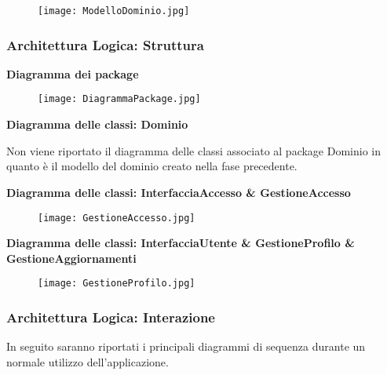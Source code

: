 \begin{figure}[h!]
    \begin{center}
        \texttt{[image: ModelloDominio.jpg]}
    \end{center}
\end{figure}
\hfill \break

\newpage
\subsubsection{Architettura Logica: Struttura}
\hfill \break

\textbf{Diagramma dei package}
\hfill \break

\begin{figure}[h!]
    \begin{center}
        \texttt{[image: DiagrammaPackage.jpg]}
    \end{center}
\end{figure}
\hfill \break

\textbf{Diagramma delle classi: Dominio}
\hfill \break

Non viene riportato il diagramma delle classi associato al package Dominio in quanto è il modello del dominio creato nella fase precedente.

\newpage

\textbf{Diagramma delle classi: InterfacciaAccesso \& GestioneAccesso}
\hfill \break

\begin{figure}[h!]
    \begin{center}
        \texttt{[image: GestioneAccesso.jpg]}
    \end{center}
\end{figure}
\hfill \break

\textbf{Diagramma delle classi: InterfacciaUtente \& GestioneProfilo \& GestioneAggiornamenti }

\begin{figure}[h!]
    \begin{center}
        \texttt{[image: GestioneProfilo.jpg]}
    \end{center}
\end{figure}
\hfill \break
\newpage

\subsubsection{Architettura Logica: Interazione}

In seguito saranno riportati i principali diagrammi di sequenza durante un normale utilizzo dell'applicazione.
\hfill \break

